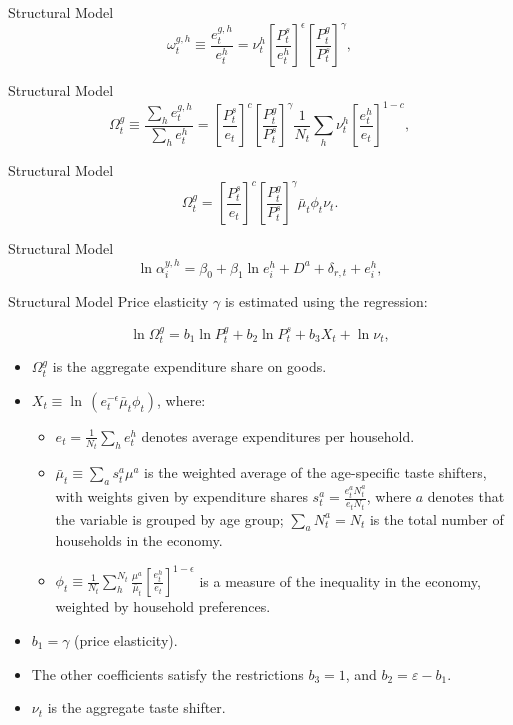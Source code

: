\documentclass[10pt]{beamer}
\begin{document}
\begin{frame}{Structural Model}
	\[
		\omega_t^{g, h} \equiv \frac{e_t^{g, h}}{e_t^h} = \nu_t^h
		\left[ \frac{P_t^s}{e_t^h} \right]^{\epsilon}
		\left[ \frac{P_t^{g}}{P_t^s} \right]^{\gamma},
	\]
\end{frame}

\begin{frame}{Structural Model}
	\[
		\Omega_t^g \equiv \frac{\sum_h e_t^{g,h}}{\sum_h e_t^h} =
		\left[ \frac{P_t^s}{e_t} \right]^c
		\left[ \frac{P_t^g}{P_t^s} \right]^\gamma
		\frac{1}{N_t} \sum_h \nu_t^h
		\left[ \frac{e_t^{h}}{e_t} \right]^{1 - c},
	\]
\end{frame}


\begin{frame}{Structural Model}
	\[
		\Omega_t^g =
		\left[ \frac{P_t^s}{e_t} \right]^c
		\left[ \frac{P_t^g}{P_t^s} \right]^\gamma
		\bar{\mu}_t \phi_t \nu_t.
	\]
\end{frame}

\begin{frame}{Structural Model}
	\[
		\ln \alpha_i^{y,h} = \beta_0 + \beta_1 \ln e_i^h + D^a + \delta_{r,t} + e_i^h,
	\]
\end{frame}

\begin{frame}{Structural Model}
	Price elasticity \(\gamma\) is estimated using the regression:

	\[
		\ln\Omega_{t}^{g}=b_{1}\ln P_{t}^{g}+b_{2}\ln P_{t}^{s}+b_{3}X_{t}+\ln\nu_{t},
	\]
	\begin{itemize}
		\item \(\Omega_{t}^g\) is the aggregate expenditure share on goods.
		\item \(X_{t}\equiv\ln\,(e_{t}^{-\epsilon}\bar{\mu}_{t}\phi_{t})\), where:
		      \begin{itemize}
			      \item \(e_{t}=\frac{1}{N_{t}}\sum_{h}e^h_{t}\) denotes average expenditures per household.
			      \item \({{\bar{\mu}_{t}\equiv\sum_{a}s_{t}^{a}\mu^{a}}}\) is the weighted average of the age-specific taste shifters, with weights given by expenditure shares \(s_{t}^a=\frac{e^a_{t}N_{t}^a}{e_{t}N_{t}}\), where \(a\) denotes that the variable is grouped by age group; \(\sum_{a}N_{t}^a=N_{t}\) is the total number of households in the economy.
			      \item \({{{\phi_{t}\equiv{\frac{1}{N_{t}}}\sum_{h}^{N_{t}}{\frac{\mu^{a}}{\bar{\mu}_{t}}}\left[{\frac{e_{t}^{h}}{e_{t}}}\right]}^{1-\epsilon}}}\) is a measure of the inequality in the economy, weighted by household preferences.
		      \end{itemize}
		\item \(b_{1}=\gamma\) (price elasticity).
		\item The other coefficients satisfy the restrictions \(b_{3} = 1\), and \(b_{2} = \varepsilon-b_{1}\).
		\item \(\nu_{t}\) is the aggregate taste shifter.
	\end{itemize}

\end{frame}
\end{document}
